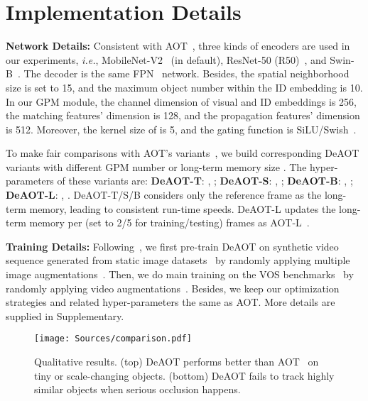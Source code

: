 \documentclass{article}
\def\ie{\emph{i.e.}}
\begin{document}
 
\section{Implementation Details}\label{sec:implementation}

\noindent\textbf{Network Details:} Consistent with AOT~\cite{aot}, three kinds of encoders are used in our experiments, \ie, MobileNet-V2~\cite{sandler2018mobilenetv2} (in default), ResNet-50 (R50)~\cite{resnet}, and Swin-B~\cite{swin}. The decoder is the same FPN~\cite{fpn} network. Besides, the spatial neighborhood size  is set to 15, and the maximum object number within the ID embedding is 10. In our GPM module, the channel dimension  of visual and ID embeddings is 256, the matching features' dimension  is 128, and the propagation features' dimension  is 512. Moreover, the kernel size of  is 5, and the gating function  is SiLU/Swish~\cite{elfwing2018sigmoid,ramachandran2017searching}.

To make fair comparisons with AOT's variants~\cite{aot}, we build corresponding DeAOT variants with different GPM number  or long-term memory size . The hyper-parameters of these variants are: \textbf{DeAOT-T}: , ; \textbf{DeAOT-S}: , ; \textbf{DeAOT-B}: , ; \textbf{DeAOT-L}: , . DeAOT-T/S/B considers only the reference frame as the long-term memory, leading to consistent run-time speeds. DeAOT-L updates the long-term memory per  (set to 2/5 for training/testing) frames as AOT-L~\cite{aot}. 

\noindent\textbf{Training Details:} Following~\cite{rgmp,spacetime,KMN,hmmn,aot}, we first pre-train DeAOT on synthetic video sequence generated from static image datasets~\cite{voc,coco,cheng2014global,shi2015hierarchical,semantic} by randomly applying multiple image augmentations~\cite{rgmp}. Then, we do main training on the VOS benchmarks~\cite{youtubevos,davis2017} by randomly applying video augmentations~\cite{cfbi,aot}. Besides, we keep our optimization strategies and related hyper-parameters the same as AOT. More details are supplied in Supplementary.





 
\begin{figure}[t!]
    \centering
    \texttt{[image: Sources/comparison.pdf]}

    \caption{Qualitative results. (top) DeAOT performs better than AOT~\cite{aot} on tiny or scale-changing objects. (bottom) DeAOT fails to track highly similar objects when serious occlusion happens.}
    \label{fig:comparisons}

\end{figure} 
\end{document}
